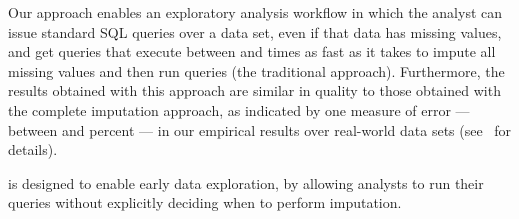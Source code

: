 

Our approach enables an exploratory analysis workflow in which the analyst can issue standard SQL queries over a data set, even if that data has missing values, and get
queries that execute between \lowxalphazero{} and \highxalphazeroexacs{} times as fast as it takes to impute all missing values and then run queries (the traditional approach). Furthermore, the results obtained with this approach
are similar in quality to those obtained with the complete imputation approach, as indicated
by one measure of error --- between \lowsmapealphazero{} and \highsmapealphaoneexacs{}
percent --- in our empirical results over real-world data sets (see~
for details).

\ProjectName{} is designed to enable early data exploration, by allowing analysts to run their queries without explicitly deciding when to perform imputation.


